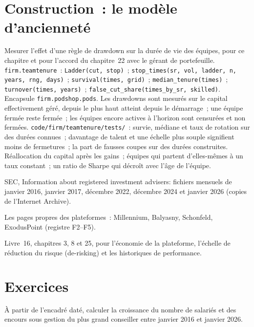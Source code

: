 \section{Construction~: le modèle d'ancienneté}\label{bld:in:multi-manager-platforms:teamtenure}

\begin{build}
 Mesurer l'effet d'une règle de drawdown sur la durée de vie des équipes, pour ce chapitre et pour
l'accord du chapitre~22 avec le gérant de portefeuille.
 \texttt{firm.teamtenure}~: \texttt{Ladder(cut, stop)}~;
\texttt{stop\_times(sr, vol, ladder, n, years, rng, days)}~; \texttt{survival(times, grid)}~; \texttt{median\_tenure(times)}~; \texttt{turnover(times, years)}~;
\texttt{false\_cut\_share(times\_by\_sr, skilled)}. Encapsule \texttt{firm.podshop.pods}.
 Les drawdowns sont mesurés sur le capital effectivement géré, depuis le plus haut atteint depuis le démarrage~; une équipe fermée reste
fermée~; les équipes encore actives à l'horizon sont censurées et non fermées.
 \texttt{code/firm/teamtenure/tests/}~: survie, médiane et taux de rotation sur des durées connues~; davantage de talent
et une échelle plus souple signifient moins de fermetures~; la part de fausses coupes sur des durées construites.
 Réallocation du capital après les gains~; équipes qui partent d'elles-mêmes à un taux constant~; un ratio de Sharpe qui
décroît avec l'âge de l'équipe.
\end{build}

\begin{omsources}
\item SEC, Information about registered investment advisers: fichiers mensuels de janvier 2016, janvier 2017, décembre 2022,
décembre 2024 et janvier 2026 (copies de l'Internet Archive).
\item Les pages propres des plateformes~: Millennium, Balyasny, Schonfeld, ExodusPoint (registre F2--F5).
\item Livre~16, chapitres 3, 8 et 25, pour l'économie de la plateforme, l'échelle de réduction du risque (de-risking) et les historiques de performance.
\end{omsources}

\section{Exercices}

\begin{exercise}[$\star$]\label{exo:in:multi-manager-platforms:1}
À partir de l'encadré daté, calculer la croissance du nombre de salariés et des encours sous gestion du plus grand conseiller entre janvier 2016 et janvier 2026.
\end{exercise}

